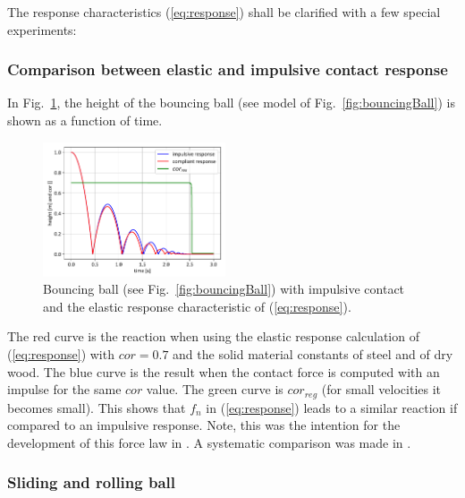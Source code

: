 The response characteristics (\ref{eq:response}) shall be clarified with a few special
experiments:

\subsubsection*{Comparison between elastic and impulsive contact response}

In Fig.~\ref{fig:bouncingBallPlot}, the height of the bouncing ball (see model
of Fig.~\ref{fig:bouncingBall}) is shown as a function of time.
%
\begin{figure}[htb]
	\centering
	\includegraphics[width=0.48\textwidth]{figures/bouncingBall_plot.pdf}
	\caption{Bouncing ball (see Fig.~\ref{fig:bouncingBall}) with impulsive contact
             and the elastic response characteristic of (\ref{eq:response}).}
	\label{fig:bouncingBallPlot}
\end{figure}
%
The red curve is the reaction when using the elastic response calculation of 
(\ref{eq:response}) with $cor = 0.7$ and the solid material constants of steel and of
dry wood. The blue curve is the result when
the contact force is computed with an impulse for the same $cor$ value.
The green curve is $cor_{reg}$ (for small velocities it becomes small).
This shows that $f_n$ in (\ref{eq:response}) leads to a similar reaction if
compared to an impulsive response. Note, this was the intention for the development
of this force law in \cite{Flores2011}. A systematic comparison was made in \cite{Skinjar2018}.
 
\subsubsection*{Sliding and rolling ball}

